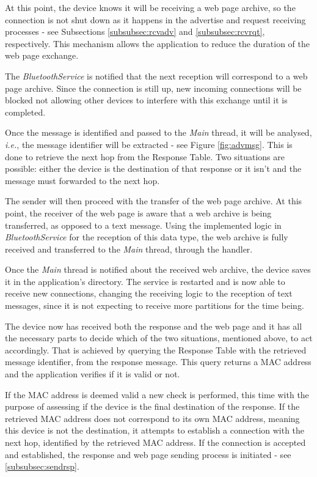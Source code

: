At this point, the device knows it will be receiving a web page archive, so the connection is not shut down as it happens in the advertise and request receiving processes - see Subsections \ref{subsubsec:rcvadv} and \ref{subsubsec:rcvrqt}, respectively. This mechanism allows the application to reduce the duration of the web page exchange.

The \textit{BluetoothService} is notified that the next reception will correspond to a web page archive. Since the connection is still up, new incoming connections will be blocked not allowing other devices to interfere with this exchange until it is completed.

Once the message is identified and passed to the \textit{Main} thread, it will be analysed, \textit{i.e.}, the message identifier will be extracted - see Figure \ref{fig:advmsg}. This is done to retrieve the next hop from the Response Table. Two situations are possible: either the device is the destination of that response or it isn't and the message must forwarded to the next hop.

The sender will then proceed with the transfer of the web page archive. At this point, the receiver of the web page is aware that a web archive is being transferred, as opposed to a text message. Using the implemented logic in \textit{BluetoothService} for the reception of this data type, the web archive is fully received and transferred to the \textit{Main} thread, through the handler.

Once the \textit{Main} thread is notified about the received web archive, the device saves it in the application's directory. The service is restarted and is now able to receive new connections, changing the receiving logic to the reception of text messages, since it is not expecting to receive more partitions for the time being.

The device now has received both the response and the web page and it has all the necessary parts to decide which of the two situations, mentioned above, to act accordingly. That is achieved by querying the Response Table with the retrieved message identifier, from the response message. This query returns a \gls{MAC} address and the application verifies if it is valid or not.

If the \gls{MAC} address is deemed valid a new check is performed, this time with the purpose of assessing if the device is the final destination of the response. If the retrieved \gls{MAC} address does not correspond to its own \gls{MAC} address, meaning this device is not the destination, it attempts to establish a connection with the next hop, identified by the retrieved \gls{MAC} address. If the connection is accepted and established, the response and web page sending process is initiated - see \ref{subsubsec:sendrsp}.

